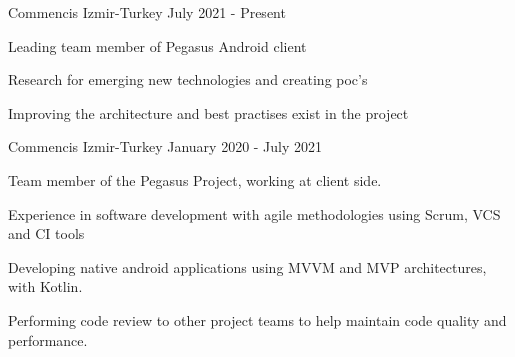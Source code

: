 

\begin{cventries}
{Commencis}
{Izmir-Turkey}
{July 2021 - Present }
{
  \begin{cvitems}
    \item {Leading team member of Pegasus Android client}
    \item {Research for emerging new technologies and creating poc's}
    \item {Improving the architecture and best practises exist in the project}
  \end{cvitems}
}
{Commencis}
{Izmir-Turkey}
{January 2020 - July 2021 }
{
  \begin{cvitems}
    \item {Team member of the Pegasus Project, working at client side. }
    \item {Experience in software development with agile methodologies using Scrum, VCS and CI tools }
    \item {Developing native android applications using MVVM and MVP architectures, with Kotlin.}
    \item {Performing code review to other project teams to help maintain code quality and performance.}
  \end{cvitems}
}

\end{cventries}
